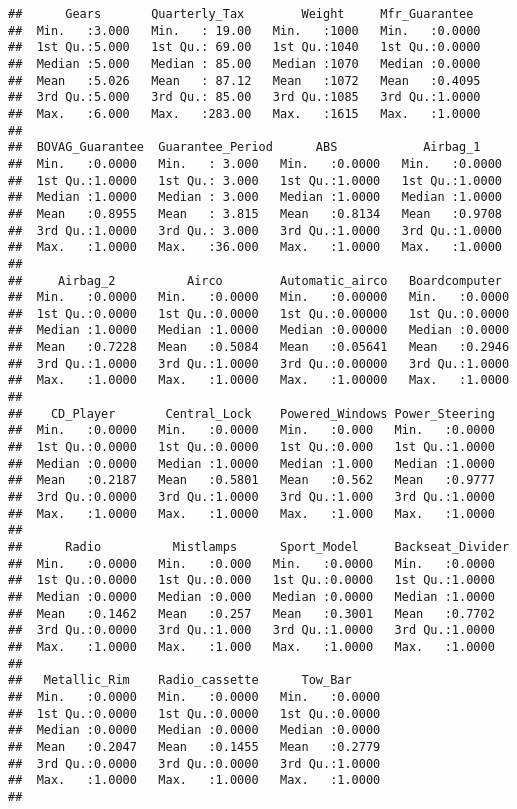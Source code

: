 \documentclass[]{article}
\begin{document}
\begin{verbatim}
##      Gears       Quarterly_Tax        Weight     Mfr_Guarantee   
##  Min.   :3.000   Min.   : 19.00   Min.   :1000   Min.   :0.0000  
##  1st Qu.:5.000   1st Qu.: 69.00   1st Qu.:1040   1st Qu.:0.0000  
##  Median :5.000   Median : 85.00   Median :1070   Median :0.0000  
##  Mean   :5.026   Mean   : 87.12   Mean   :1072   Mean   :0.4095  
##  3rd Qu.:5.000   3rd Qu.: 85.00   3rd Qu.:1085   3rd Qu.:1.0000  
##  Max.   :6.000   Max.   :283.00   Max.   :1615   Max.   :1.0000  
##                                                                  
##  BOVAG_Guarantee  Guarantee_Period      ABS            Airbag_1     
##  Min.   :0.0000   Min.   : 3.000   Min.   :0.0000   Min.   :0.0000  
##  1st Qu.:1.0000   1st Qu.: 3.000   1st Qu.:1.0000   1st Qu.:1.0000  
##  Median :1.0000   Median : 3.000   Median :1.0000   Median :1.0000  
##  Mean   :0.8955   Mean   : 3.815   Mean   :0.8134   Mean   :0.9708  
##  3rd Qu.:1.0000   3rd Qu.: 3.000   3rd Qu.:1.0000   3rd Qu.:1.0000  
##  Max.   :1.0000   Max.   :36.000   Max.   :1.0000   Max.   :1.0000  
##                                                                     
##     Airbag_2          Airco        Automatic_airco   Boardcomputer   
##  Min.   :0.0000   Min.   :0.0000   Min.   :0.00000   Min.   :0.0000  
##  1st Qu.:0.0000   1st Qu.:0.0000   1st Qu.:0.00000   1st Qu.:0.0000  
##  Median :1.0000   Median :1.0000   Median :0.00000   Median :0.0000  
##  Mean   :0.7228   Mean   :0.5084   Mean   :0.05641   Mean   :0.2946  
##  3rd Qu.:1.0000   3rd Qu.:1.0000   3rd Qu.:0.00000   3rd Qu.:1.0000  
##  Max.   :1.0000   Max.   :1.0000   Max.   :1.00000   Max.   :1.0000  
##                                                                      
##    CD_Player       Central_Lock    Powered_Windows Power_Steering  
##  Min.   :0.0000   Min.   :0.0000   Min.   :0.000   Min.   :0.0000  
##  1st Qu.:0.0000   1st Qu.:0.0000   1st Qu.:0.000   1st Qu.:1.0000  
##  Median :0.0000   Median :1.0000   Median :1.000   Median :1.0000  
##  Mean   :0.2187   Mean   :0.5801   Mean   :0.562   Mean   :0.9777  
##  3rd Qu.:0.0000   3rd Qu.:1.0000   3rd Qu.:1.000   3rd Qu.:1.0000  
##  Max.   :1.0000   Max.   :1.0000   Max.   :1.000   Max.   :1.0000  
##                                                                    
##      Radio          Mistlamps      Sport_Model     Backseat_Divider
##  Min.   :0.0000   Min.   :0.000   Min.   :0.0000   Min.   :0.0000  
##  1st Qu.:0.0000   1st Qu.:0.000   1st Qu.:0.0000   1st Qu.:1.0000  
##  Median :0.0000   Median :0.000   Median :0.0000   Median :1.0000  
##  Mean   :0.1462   Mean   :0.257   Mean   :0.3001   Mean   :0.7702  
##  3rd Qu.:0.0000   3rd Qu.:1.000   3rd Qu.:1.0000   3rd Qu.:1.0000  
##  Max.   :1.0000   Max.   :1.000   Max.   :1.0000   Max.   :1.0000  
##                                                                    
##   Metallic_Rim    Radio_cassette      Tow_Bar      
##  Min.   :0.0000   Min.   :0.0000   Min.   :0.0000  
##  1st Qu.:0.0000   1st Qu.:0.0000   1st Qu.:0.0000  
##  Median :0.0000   Median :0.0000   Median :0.0000  
##  Mean   :0.2047   Mean   :0.1455   Mean   :0.2779  
##  3rd Qu.:0.0000   3rd Qu.:0.0000   3rd Qu.:1.0000  
##  Max.   :1.0000   Max.   :1.0000   Max.   :1.0000  
## 
\end{verbatim}
\end{document}
